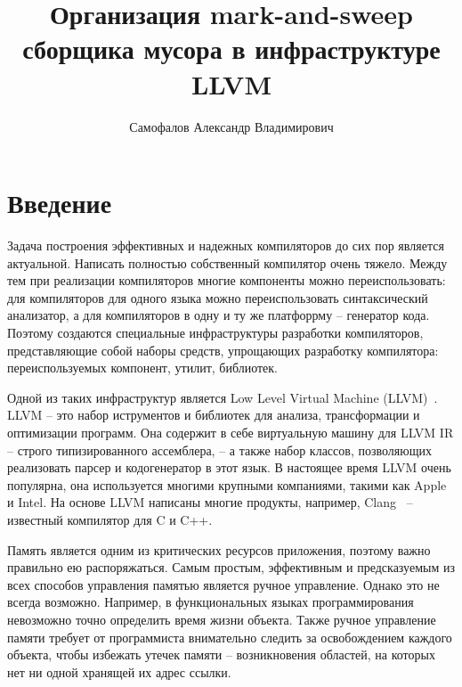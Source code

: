 \title{Организация mark-and-sweep сборщика мусора в инфраструктуре LLVM}
%
\author{Самофалов Александр Владимирович}
%
%

%
%

\maketitle              %

\begin{abstract}
\end{abstract}
%

\section*{Введение}
Задача построения эффективных и надежных компиляторов до сих пор является актуальной. Написать полностью собственный компилятор очень тяжело. Между тем при реализации компиляторов многие компоненты можно переиспользовать: для компиляторов для одного языка можно переиспользовать синтаксический анализатор, а для компиляторов в одну и ту же платфоррму -- генератор кода. Поэтому создаются специальные инфраструктуры разработки компиляторов, представляющие собой наборы средств, упрощающих разработку компилятора: переиспользуемых компонент, утилит, библиотек.

Одной из таких инфраструктур является Low Level Virtual Machine (LLVM)~\cite{llvm}. LLVM -- это набор иструментов и библиотек для анализа, трансформации и оптимизации программ. Она содержит в себе виртуальную машину для LLVM IR -- строго типизированного ассемблера, -- а также набор классов, позволяющих реализовать парсер и кодогенератор в этот язык. В настоящее время LLVM очень популярна, она используется многими крупными компаниями, такими как Apple и Intel. На основе LLVM написаны многие продукты, например, Clang~\cite{clang} -- известный компилятор для C и C++.

Память является одним из критических ресурсов приложения, поэтому важно правильно ею распоряжаться. 
Самым простым, эффективным и предсказуемым из всех способов управления памятью является ручное управление. 
Однако это не всегда возможно. Например, в функциональных языках программирования невозможно точно
определить время жизни объекта. Также ручное управление памяти требует от программиста внимательно следить
за освобождением каждого объекта, чтобы избежать утечек памяти -- возникновения областей, на которых нет ни одной 
хранящей их адрес ссылки.

